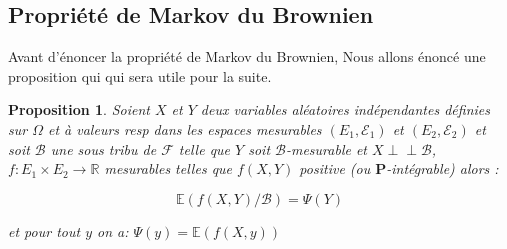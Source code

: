 \documentclass[A4paper,12pt]{report}
\def\Perp{\perp\!\!\!\perp}
\newtheorem{proposition}{Proposition}[chapter]
\begin{document}
\subsection{Propriété de Markov du Brownien}
Avant d'énoncer la propriété de Markov du Brownien, Nous allons énoncé une proposition qui qui sera utile pour la suite.
\begin{proposition} \label{prop3}
Soient $X$ et $Y$ deux variables aléatoires indépendantes définies sur $\Omega$ et à valeurs resp dans les espaces mesurables $\left(E_{1},\mathcal{E}_{1} \right)$ et $\left(E_{2}, \mathcal{E}_{2}\right)$ et soit $\mathcal{B}$ une sous tribu de $\mathcal{F}$ telle que $Y$ soit $\mathcal{B}$-mesurable et $X \Perp \mathcal{B}$, $f: E_{1} \times E_{2} \longrightarrow \mathbb{R}$ mesurables telles que $f(X, Y)$  positive (ou $\mathbf{P}$-intégrable) alors :

$$\mathbb{E}(f(X, Y)/\mathcal{B})=\Psi(Y)$$

et pour tout $y$ on a: $\Psi(y)=\mathbb{E}(f(X, y))$ 
\end{proposition} 
\end{document}
